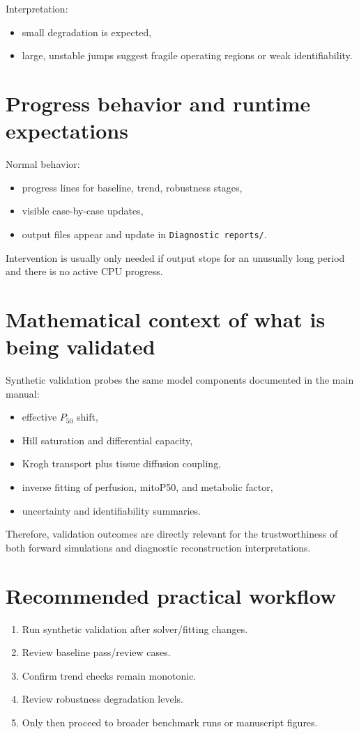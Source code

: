 \documentclass[12pt,a4paper]{article}
\begin{document}
Interpretation:
\begin{itemize}
    \item small degradation is expected,
    \item large, unstable jumps suggest fragile operating regions or weak identifiability.
\end{itemize}

\section{Progress behavior and runtime expectations}
Normal behavior:
\begin{itemize}
    \item progress lines for baseline, trend, robustness stages,
    \item visible case-by-case updates,
    \item output files appear and update in \texttt{Diagnostic reports/}.
\end{itemize}

Intervention is usually only needed if output stops for an unusually long period and there is no active CPU progress.

\section{Mathematical context of what is being validated}
Synthetic validation probes the same model components documented in the main manual:
\begin{itemize}
    \item effective $P_{50}$ shift,
    \item Hill saturation and differential capacity,
    \item Krogh transport plus tissue diffusion coupling,
    \item inverse fitting of perfusion, mitoP50, and metabolic factor,
    \item uncertainty and identifiability summaries.
\end{itemize}

Therefore, validation outcomes are directly relevant for the trustworthiness of both forward simulations and diagnostic reconstruction interpretations.

\section{Recommended practical workflow}
\begin{enumerate}
    \item Run synthetic validation after solver/fitting changes.
    \item Review baseline pass/review cases.
    \item Confirm trend checks remain monotonic.
    \item Review robustness degradation levels.
    \item Only then proceed to broader benchmark runs or manuscript figures.
\end{enumerate}
\end{document}
